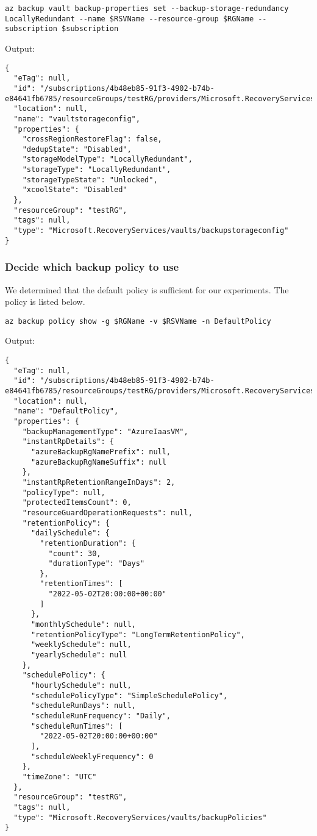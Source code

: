 \begin{verbatim}
az backup vault backup-properties set --backup-storage-redundancy LocallyRedundant --name $RSVName --resource-group $RGName --subscription $subscription
\end{verbatim}

Output:
\begin{verbatim}
{
  "eTag": null,
  "id": "/subscriptions/4b48eb85-91f3-4902-b74b-e84641fb6785/resourceGroups/testRG/providers/Microsoft.RecoveryServices/vaults/myRSV/backupstorageconfig/vaultstorageconfig",
  "location": null,
  "name": "vaultstorageconfig",
  "properties": {
    "crossRegionRestoreFlag": false,
    "dedupState": "Disabled",
    "storageModelType": "LocallyRedundant",
    "storageType": "LocallyRedundant",
    "storageTypeState": "Unlocked",
    "xcoolState": "Disabled"
  },
  "resourceGroup": "testRG",
  "tags": null,
  "type": "Microsoft.RecoveryServices/vaults/backupstorageconfig"
}
\end{verbatim}
\subsubsection{Decide which backup policy to use}
\label{sec:orgbd40151}
We determined that the default policy is sufficient for our experiments.
The policy is listed below.

\begin{verbatim}
az backup policy show -g $RGName -v $RSVName -n DefaultPolicy
\end{verbatim}

Output:
\begin{verbatim}
{
  "eTag": null,
  "id": "/subscriptions/4b48eb85-91f3-4902-b74b-e84641fb6785/resourceGroups/testRG/providers/Microsoft.RecoveryServices/vaults/myRSV/backupPolicies/DefaultPolicy",
  "location": null,
  "name": "DefaultPolicy",
  "properties": {
    "backupManagementType": "AzureIaasVM",
    "instantRpDetails": {
      "azureBackupRgNamePrefix": null,
      "azureBackupRgNameSuffix": null
    },
    "instantRpRetentionRangeInDays": 2,
    "policyType": null,
    "protectedItemsCount": 0,
    "resourceGuardOperationRequests": null,
    "retentionPolicy": {
      "dailySchedule": {
        "retentionDuration": {
          "count": 30,
          "durationType": "Days"
        },
        "retentionTimes": [
          "2022-05-02T20:00:00+00:00"
        ]
      },
      "monthlySchedule": null,
      "retentionPolicyType": "LongTermRetentionPolicy",
      "weeklySchedule": null,
      "yearlySchedule": null
    },
    "schedulePolicy": {
      "hourlySchedule": null,
      "schedulePolicyType": "SimpleSchedulePolicy",
      "scheduleRunDays": null,
      "scheduleRunFrequency": "Daily",
      "scheduleRunTimes": [
        "2022-05-02T20:00:00+00:00"
      ],
      "scheduleWeeklyFrequency": 0
    },
    "timeZone": "UTC"
  },
  "resourceGroup": "testRG",
  "tags": null,
  "type": "Microsoft.RecoveryServices/vaults/backupPolicies"
}
\end{verbatim}
